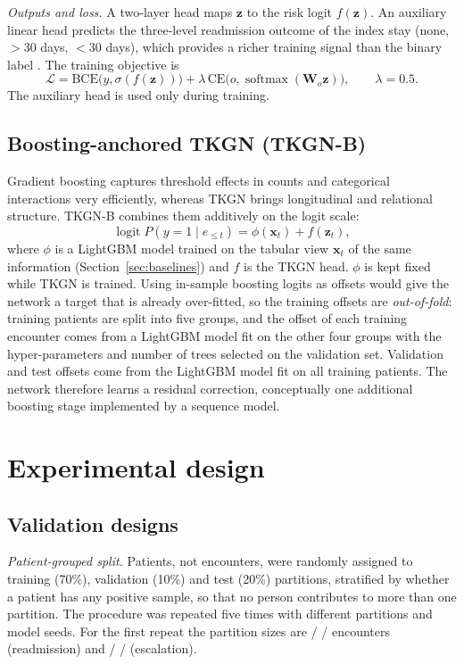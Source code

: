 \documentclass[preprint,12pt,authoryear]{elsarticle}
\newcommand{\vect}[1]{\mathbf{#1}}
\begin{document}
\emph{Outputs and loss.} A two-layer head maps $\vect{z}$ to the risk
logit $f(\vect{z})$. An auxiliary linear head predicts the three-level
readmission outcome of the index stay (none, $>30$ days, $<30$ days), which
provides a richer training signal than the binary label
\citep{caruana1997}. The training objective is
\begin{equation}
  \mathcal{L} = \mathrm{BCE}\big(y, \sigma(f(\vect{z}))\big)
   + \lambda\,\mathrm{CE}\big(o, \operatorname{softmax}(\vect{W}_o\vect{z})\big),
   \qquad \lambda = 0.5 .
\end{equation}
The auxiliary head is used only during training.

\subsection{Boosting-anchored TKGN (TKGN-B)}
\label{sec:tkgnb}
Gradient boosting captures threshold effects in counts and categorical
interactions very efficiently, whereas TKGN brings longitudinal and
relational structure. TKGN-B combines them additively on the logit scale:
\begin{equation}
  \operatorname{logit} P(y=1\mid e_{\le t}) = \phi(\vect{x}_t) + f(\vect{z}_t),
\end{equation}
where $\phi$ is a LightGBM model \citep{ke2017lightgbm} trained on the
tabular view $\vect{x}_t$ of the same information (Section~\ref{sec:baselines})
and $f$ is the TKGN head. $\phi$ is kept fixed while TKGN is trained.
Using in-sample boosting logits as offsets would give the network a
target that is already over-fitted, so the training offsets are
\emph{out-of-fold}: training patients are split into five groups, and
the offset of each training encounter comes from a LightGBM model fit on
the other four groups with the hyper-parameters and number of trees
selected on the validation set. Validation and test offsets come from the
LightGBM model fit on all training patients. The network therefore learns
a residual correction, conceptually one additional boosting stage
\citep{friedman2001} implemented by a sequence model.

\section{Experimental design}
\label{sec:experiments}

\subsection{Validation designs}
\emph{Patient-grouped split.} Patients, not encounters, were randomly
assigned to training (70\%), validation (10\%) and test (20\%)
partitions, stratified by whether a patient has any positive sample, so
that no person contributes to more than one partition. The procedure was
repeated five times with different partitions and model seeds. For the
first repeat the partition sizes are \NReadmitGrpTrain{} / \NReadmitGrpVal{}
/ \NReadmitGrpTest{} encounters (readmission) and \NEscGrpTrain{} /
\NEscGrpVal{} / \NEscGrpTest{} (escalation).
\end{document}
